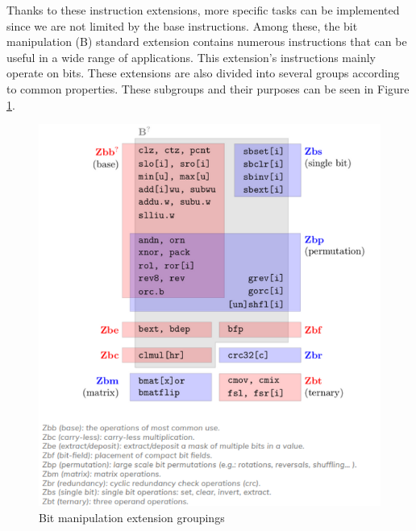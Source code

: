 Thanks to these instruction extensions, more specific tasks can be implemented since we are not limited by the base instructions.
Among these, the bit manipulation (B) standard extension contains numerous instructions that can be useful in a wide range of applications. This extension's instructions mainly operate on bits. These extensions are also divided into several groups according to common properties. These subgroups and their purposes can be seen in Figure \ref{fig:bit_manipulation_extension_groupings}.
\begin{figure}[h!]
    \centering
    \includegraphics{riscv/bit_manipulation_extension_groupings.png}
    \caption{Bit manipulation extension groupings \cite{bitmanipgroups}}
    \label{fig:bit_manipulation_extension_groupings}
\end{figure}

